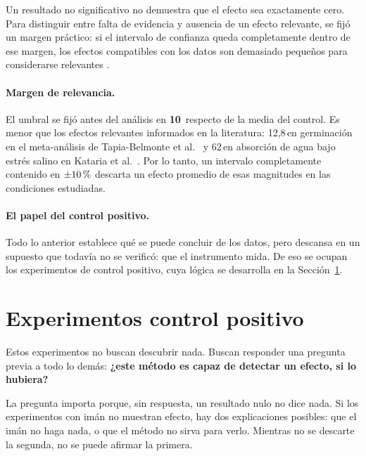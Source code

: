 \begin{interpretacionfisica}
\titulointerpretacion
Un resultado no significativo no demuestra que el efecto sea exactamente cero. Para distinguir entre falta de evidencia y ausencia de un efecto relevante, se fijó un margen práctico: si el intervalo de confianza queda completamente dentro de ese margen, los efectos compatibles con los datos son demasiado pequeños para considerarse relevantes \cite{schuirmann_1987,lakens_2017}.
\end{interpretacionfisica}

\paragraph{Margen de relevancia.}\label{par:umbral_relevancia}

El umbral se fijó antes del análisis en \textbf{10\,\pct} respecto de la media del control. Es menor que los efectos relevantes informados en la literatura: 12{,}8\,\pct en germinación en el meta-análisis de Tapia-Belmonte et al.~\cite{tapia_belmonte_2023} y 62\,\pct en absorción de agua bajo estrés salino en Kataria et al.~\cite{kataria_2017}. Por lo tanto, un intervalo completamente contenido en \(\pm 10\,\text{\%}\) descarta un efecto promedio de esas magnitudes en las condiciones estudiadas.

\paragraph{El papel del control positivo.}

Todo lo anterior establece qué se puede concluir de los datos, pero descansa en un supuesto que todavía no se verificó: que el instrumento mida. De eso se ocupan los experimentos de control positivo, cuya lógica se desarrolla en la Sección~\ref{subsec:ctrl_positivo}.

\section{Experimentos control positivo}
\label{subsec:ctrl_positivo}

Estos experimentos no buscan descubrir nada. Buscan responder una pregunta previa a todo lo demás: \textbf{¿este método es capaz de detectar un efecto, si lo hubiera?}

La pregunta importa porque, sin respuesta, un resultado nulo no dice nada. Si los experimentos con imán no muestran efecto, hay dos explicaciones posibles: que el imán no haga nada, o que el método no sirva para verlo. Mientras no se descarte la segunda, no se puede afirmar la primera.

